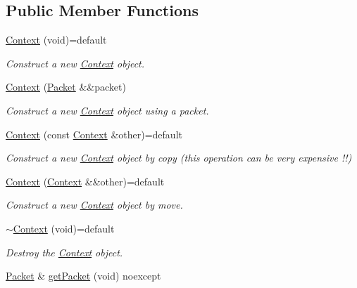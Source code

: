\subsection*{Public Member Functions}
\begin{DoxyCompactItemize}
\item 
\mbox{\hyperlink{classo_z_1_1_context_af3aab1b32d4333320612049bdafb07d7}{Context}} (void)=default
\begin{DoxyCompactList}\small\item\em Construct a new \mbox{\hyperlink{classo_z_1_1_context}{Context}} object. \end{DoxyCompactList}\item 
\mbox{\hyperlink{classo_z_1_1_context_aa57df3d21eacc6e149f9c61c0c3f196b}{Context}} (\mbox{\hyperlink{classo_z_1_1_packet}{Packet}} \&\&packet)
\begin{DoxyCompactList}\small\item\em Construct a new \mbox{\hyperlink{classo_z_1_1_context}{Context}} object using a packet. \end{DoxyCompactList}\item 
\mbox{\hyperlink{classo_z_1_1_context_a906eb29f22e89bc121c47096c7a4b601}{Context}} (const \mbox{\hyperlink{classo_z_1_1_context}{Context}} \&other)=default
\begin{DoxyCompactList}\small\item\em Construct a new \mbox{\hyperlink{classo_z_1_1_context}{Context}} object by copy (this operation can be very expensive !!) \end{DoxyCompactList}\item 
\mbox{\hyperlink{classo_z_1_1_context_ad4a49704266f6e8312b1c9c2ca8ad710}{Context}} (\mbox{\hyperlink{classo_z_1_1_context}{Context}} \&\&other)=default
\begin{DoxyCompactList}\small\item\em Construct a new \mbox{\hyperlink{classo_z_1_1_context}{Context}} object by move. \end{DoxyCompactList}\item 
\mbox{\hyperlink{classo_z_1_1_context_afe2e01a552a7711772e4028f778703e8}{$\sim$\+Context}} (void)=default
\begin{DoxyCompactList}\small\item\em Destroy the \mbox{\hyperlink{classo_z_1_1_context}{Context}} object. \end{DoxyCompactList}\item 
\mbox{\hyperlink{classo_z_1_1_packet}{Packet}} \& \mbox{\hyperlink{classo_z_1_1_context_ad2814c8e2b850cb4c5a70a964dbd3d58}{get\+Packet}} (void) noexcept

\end{DoxyCompactItemize}
